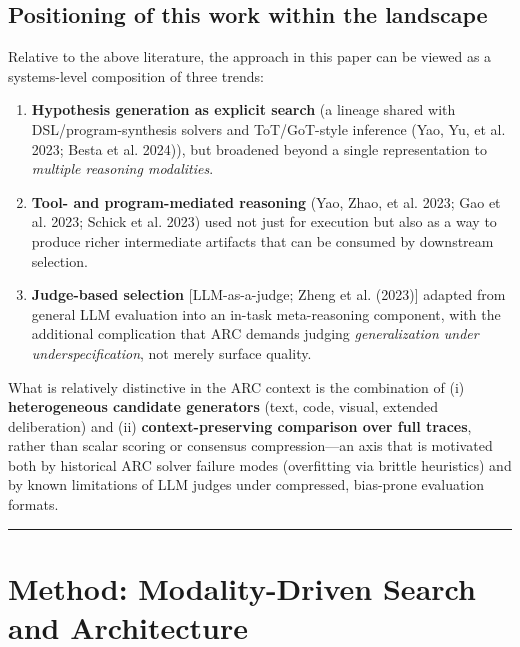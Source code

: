 \documentclass[11pt]{article}
\begin{document}
\hypertarget{positioning-of-this-work-within-the-landscape}{%
\subsection{Positioning of this work within the
landscape}\label{positioning-of-this-work-within-the-landscape}}

Relative to the above literature, the approach in this paper can be
viewed as a systems-level composition of three trends:

\begin{enumerate}
\def\labelenumi{\arabic{enumi}.}
\item
  \textbf{Hypothesis generation as explicit search} (a lineage shared
  with DSL/program-synthesis solvers and ToT/GoT-style inference (Yao,
  Yu, et al. 2023; Besta et al. 2024)), but broadened beyond a single
  representation to \emph{multiple reasoning modalities}.
\item
  \textbf{Tool- and program-mediated reasoning} (Yao, Zhao, et al. 2023;
  Gao et al. 2023; Schick et al. 2023) used not just for execution but
  also as a way to produce richer intermediate artifacts that can be
  consumed by downstream selection.
\item
  \textbf{Judge-based selection} {[}LLM-as-a-judge; Zheng et al.
  (2023){]} adapted from general LLM evaluation into an in-task
  meta-reasoning component, with the additional complication that ARC
  demands judging \emph{generalization under underspecification}, not
  merely surface quality.
\end{enumerate}

What is relatively distinctive in the ARC context is the combination of
(i) \textbf{heterogeneous candidate generators} (text, code, visual,
extended deliberation) and (ii) \textbf{context-preserving comparison
over full traces}, rather than scalar scoring or consensus
compression---an axis that is motivated both by historical ARC solver
failure modes (overfitting via brittle heuristics) and by known
limitations of LLM judges under compressed, bias-prone evaluation
formats.

\begin{center}\rule{0.5\linewidth}{0.5pt}\end{center}

\hypertarget{method-modality-driven-search-and-architecture}{%
\section{Method: Modality-Driven Search and
Architecture}\label{method-modality-driven-search-and-architecture}}
\end{document}
